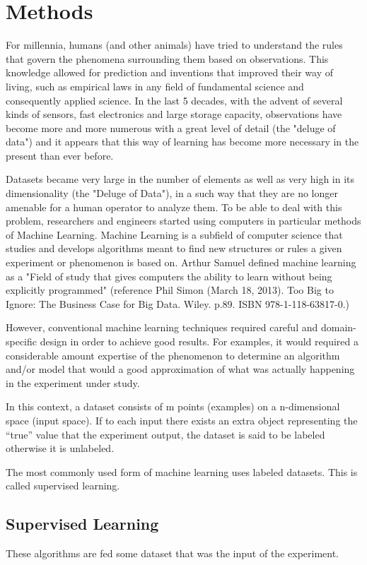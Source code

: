 \documentclass{article}
\begin{document}
\section{Methods}
For millennia, humans (and other animals) have tried to understand the rules that govern the phenomena surrounding them based on observations. This knowledge allowed for prediction and inventions that improved their way of living, such as empirical laws in any field of fundamental science and consequently applied science. In the last 5 decades, with the advent of several kinds of sensors, fast electronics and large storage capacity, observations have become more and more numerous with a great level of detail (the "deluge of data") and it appears that this way of learning has become more necessary in the present than ever before.

Datasets became very large in the number of elements as well as very high in its dimensionality (the "Deluge of Data"), in a such way that they are no longer amenable for a human operator to analyze them. To be able to deal with this problem, researchers and engineers started using computers in particular methods of Machine Learning. Machine Learning is a subfield of computer science that studies and develops algorithms meant to find new structures or rules a given experiment or phenomenon is based on. Arthur Samuel defined machine learning as a "Field of study that gives computers the ability to learn without being explicitly programmed" (reference Phil Simon (March 18, 2013). Too Big to Ignore: The Business Case for Big Data. Wiley. p.89. ISBN 978-1-118-63817-0.)

However, conventional machine learning techniques required careful and domain-specific design in order to achieve good results. For examples, it would required a considerable amount expertise of the phenomenon to determine an algorithm and/or model that would a good approximation of what was actually happening in the experiment under study.

In this context, a dataset consists of m points (examples) on a n-dimensional space (input space). If to each input there exists an extra object representing the “true” value that the experiment output, the dataset is said to be labeled otherwise it is unlabeled. 

The most commonly used form of machine learning uses labeled datasets. This is called supervised learning.

\subsection{Supervised Learning}
\label{subsec:supervised-learning}
These algorithms are fed some dataset that was the input of the experiment. 
\end{document}
